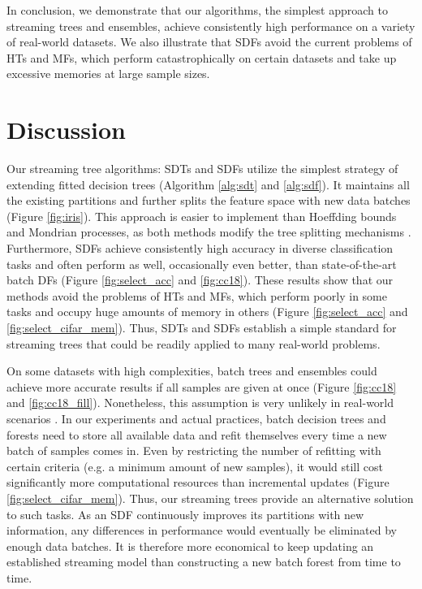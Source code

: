 In conclusion, we demonstrate that our algorithms, the simplest approach to streaming trees and ensembles, achieve consistently high performance on a variety of real-world datasets. 
We also illustrate that SDFs avoid the current problems of HTs and MFs, which perform catastrophically on certain datasets and take up excessive memories at large sample sizes. 

\section{Discussion}
\label{discussion}
Our streaming tree algorithms: SDTs and SDFs utilize the simplest strategy of extending fitted decision trees (Algorithm \ref{alg:sdt} and \ref{alg:sdf}). It maintains all the existing partitions and further splits the feature space with new data batches (Figure \ref{fig:iris}). This approach is easier to implement than Hoeffding bounds and Mondrian processes, as both methods modify the tree splitting mechanisms \citep{hoeffding_probability_1994, domingos_mining_2000, roy_mondrian_2009, lakshminarayanan_mondrian_2014}. 
Furthermore, SDFs achieve consistently high accuracy in diverse classification tasks and often perform as well, occasionally even better, than state-of-the-art batch DFs (Figure \ref{fig:select_acc} and \ref{fig:cc18}). These results show that our methods avoid the problems of HTs and MFs, which perform poorly in some tasks and occupy huge amounts of memory in others (Figure \ref{fig:select_acc} and \ref{fig:select_cifar_mem}). Thus, SDTs and SDFs establish a simple standard for streaming trees that could be readily applied to many real-world problems.

On some datasets with high complexities, batch trees and ensembles could achieve more accurate results if all samples are given at once (Figure \ref{fig:cc18} and \ref{fig:cc18_fill}). Nonetheless, this assumption is very unlikely in real-world scenarios \citep{abdulsalam_streaming_2007, liu_isolation_2008}. In our experiments and actual practices, batch decision trees and forests need to store all available data and refit themselves every time a new batch of samples comes in. Even by restricting the number of refitting with certain criteria (e.g. a minimum amount of new samples), it would still cost significantly more computational resources than incremental updates (Figure \ref{fig:select_cifar_mem}). Thus, our streaming trees provide an alternative solution to such tasks. As an SDF continuously improves its partitions with new information, any differences in performance would eventually be eliminated by enough data batches. It is therefore more economical to keep updating an established streaming model than constructing a new batch forest from time to time.

